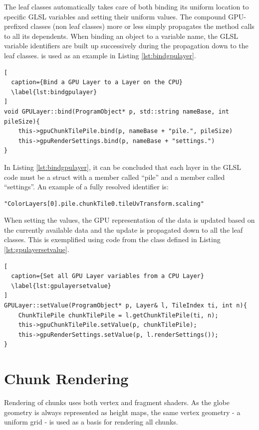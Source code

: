 The leaf classes automatically takes care of both binding its uniform location to specific GLSL variables and  setting their uniform values. The compound GPU-prefixed classes (non leaf classes) more or less simply propagates the method calls to all its dependents. When binding an object to a variable name, the GLSL variable identifiers are built up successively during the propagation down to the leaf classes.  is used as an example in Listing \ref{lst:bindgpulayer}.

\begin{lstlisting}[
  caption={Bind a GPU Layer to a Layer on the CPU} 
  \label{lst:bindgpulayer}
]
void GPULayer::bind(ProgramObject* p, std::string nameBase, int pileSize){
	this->gpuChunkTilePile.bind(p, nameBase + "pile.", pileSize)
	this->gpuRenderSettings.bind(p, nameBase + "settings.")
}
\end{lstlisting}

In Listing \ref{lst:bindgpulayer}, it can be concluded that each layer in the GLSL code must be a struct with a member called ``pile'' and a member called ``settings''. An example of a fully resolved identifier is: 

\begin{lstlisting}[]
"ColorLayers[0].pile.chunkTile0.tileUvTransform.scaling"
\end{lstlisting}

When setting the values, the GPU representation of the data is updated based on the currently available  data and the update is propagated down to all the leaf classes. This is exemplified using code from the  class defined in Listing \ref{lst:gpulayersetvalue}.

\begin{lstlisting}[
  caption={Set all GPU Layer variables from a CPU Layer} 
  \label{lst:gpulayersetvalue}
]
GPULayer::setValue(ProgramObject* p, Layer& l, TileIndex ti, int n){
	ChunkTilePile chunkTilePile = l.getChunkTilePile(ti, n);
	this->gpuChunkTilePile.setValue(p, chunkTilePile);
	this->gpuRenderSettings.setValue(p, l.renderSettings());
}
\end{lstlisting}

\section{Chunk Rendering}

Rendering of chunks uses both vertex and fragment shaders. As the globe geometry is always represented as height maps, the same vertex geometry - a uniform grid - is used as a basis for rendering all chunks.

